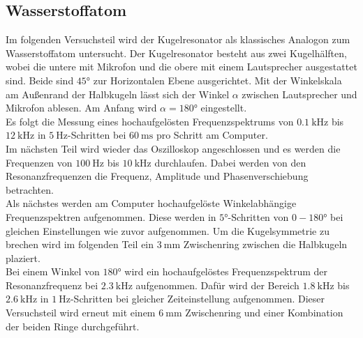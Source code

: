 \subsection{Wasserstoffatom}
Im folgenden Versuchsteil wird der Kugelresonator als klassisches Analogon zum Wasserstoffatom untersucht.
Der Kugelresonator besteht aus zwei Kugelhälften, wobei die untere mit Mikrofon und die obere mit einem Lautsprecher ausgestattet sind.
Beide sind $\ang{45;;}$ zur Horizontalen Ebene ausgerichtet.
Mit der Winkelskala am Außenrand der Halbkugeln lässt sich der Winkel $\alpha$ zwischen Lautsprecher und Mikrofon ablesen.
Am Anfang wird $\alpha = \ang{180;;}$ eingestellt.
\\
 Es folgt die Messung eines hochaufgelösten Frequenzspektrums von $\SI{0.1}{\kilo\hertz}$ bis $\SI{12}{\kilo\hertz}$ 
in $\SI{5}{\hertz}$-Schritten bei $\SI{60}{\milli\second}$ pro Schritt am Computer.
\\
Im nächsten Teil wird wieder das Oszilloskop angeschlossen und es werden die Frequenzen von $\SI{100}{\hertz}$ bis $\SI{10}{\kilo\hertz}$ durchlaufen.
Dabei werden von den Resonanzfrequenzen die Frequenz, Amplitude und Phasenverschiebung betrachten.
\\
Als nächstes werden am Computer hochaufgelöste Winkelabhängige Frequenzspektren aufgenommen. Diese werden in $\ang{5;;}$-Schritten von $0-\ang{180;;}$ bei gleichen Einstellungen wie zuvor aufgenommen.
Um die Kugelsymmetrie zu brechen wird im folgenden Teil ein $\SI{3}{\milli\meter}$ Zwischenring zwischen die Halbkugeln plaziert.
\\
Bei einem Winkel von $\ang{180;;}$ wird ein hochaufgelöstes Frequenzspektrum der Resonanzfrequenz bei $\SI{2.3}{\kilo\hertz}$ aufgenommen.
Dafür wird der Bereich $\SI{1.8}{\kilo\hertz}$ bis  $\SI{2.6}{\kilo\hertz}$ in  $\SI{1}{\hertz}$-Schritten bei gleicher Zeiteinstellung aufgenommen.
Dieser Versuchsteil wird erneut mit einem $\SI{6}{\milli\meter}$ Zwischenring und einer Kombination der beiden Ringe durchgeführt.

